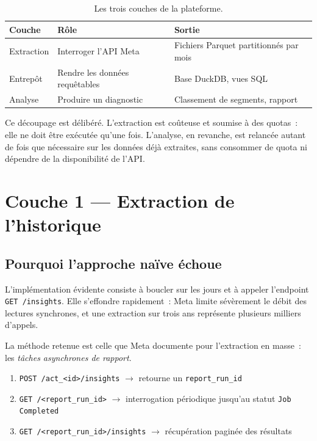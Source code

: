 \documentclass[11pt,a4paper]{article}
\newcommand{\code}[1]{\texttt{\small #1}}
\begin{document}
\begin{table}[h]
\centering
\small
\begin{tabular}{@{}llp{7.6cm}@{}}
\toprule
\textbf{Couche} & \textbf{Rôle} & \textbf{Sortie} \\
\midrule
Extraction & Interroger l'API Meta & Fichiers Parquet partitionnés par mois \\
Entrepôt & Rendre les données requêtables & Base DuckDB, vues SQL \\
Analyse & Produire un diagnostic & Classement de segments, rapport \\
\bottomrule
\end{tabular}
\caption{Les trois couches de la plateforme.}
\end{table}

Ce découpage est délibéré. L'extraction est coûteuse et soumise à des quotas~:
elle ne doit être exécutée qu'une fois. L'analyse, en revanche, est relancée
autant de fois que nécessaire sur les données déjà extraites, sans consommer de
quota ni dépendre de la disponibilité de l'API.

\section{Couche 1 --- Extraction de l'historique}

\subsection{Pourquoi l'approche naïve échoue}

L'implémentation évidente consiste à boucler sur les jours et à appeler
l'endpoint \code{GET /insights}. Elle s'effondre rapidement~: Meta limite
sévèrement le débit des lectures synchrones, et une extraction sur trois ans
représente plusieurs milliers d'appels.

La méthode retenue est celle que Meta documente pour l'extraction en masse~:
les \emph{tâches asynchrones de rapport}.

\begin{enumerate}
  \item \code{POST /act\_<id>/insights} $\rightarrow$ retourne un
        \code{report\_run\_id}
  \item \code{GET /<report\_run\_id>} $\rightarrow$ interrogation périodique
        jusqu'au statut \code{Job Completed}
  \item \code{GET /<report\_run\_id>/insights} $\rightarrow$ récupération
        paginée des résultats
\end{enumerate}
\end{document}
